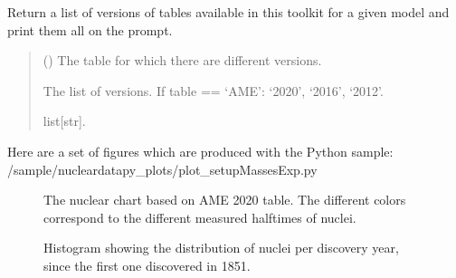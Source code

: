 \documentclass[letterpaper,10pt,english]{sphinxmanual}
\begin{document}
\begin{fulllineitems}
\label{\detokenize{source/api/setup_masses_exp:nucleardatapy.setup_masses_exp.versions_masses_exp}}
\pysigstartsignatures
{}
\pysigstopsignatures
\sphinxAtStartPar
Return a list of versions of tables available in
this toolkit for a given model and print them all on the prompt.
\begin{quote}\begin{description}
\sphinxAtStartPar
{} () \textendash{} The table for which there are different versions.

\sphinxAtStartPar
The list of versions.     If table == ‘AME’: ‘2020’, ‘2016’, ‘2012’.

\sphinxAtStartPar
list{[}str{]}.

\end{description}\end{quote}

\end{fulllineitems}


\sphinxAtStartPar
Here are a set of figures which are produced with the Python sample: /sample/nucleardatapy\_plots/plot\_setupMassesExp.py

\begin{figure}[htbp]
\centering
\capstart

\noindent{}
\caption{The nuclear chart based on AME 2020 table. The different colors correspond to the different measured half\sphinxhyphen{}times of nuclei.}\label{\detokenize{source/api/setup_masses_exp:id1}}\end{figure}

\begin{figure}[htbp]
\centering
\capstart

\noindent{}
\caption{Histogram showing the distribution of nuclei per discovery year, since the first one discovered in 1851.}\label{\detokenize{source/api/setup_masses_exp:id2}}\end{figure}

\sphinxstepscope
\end{document}
